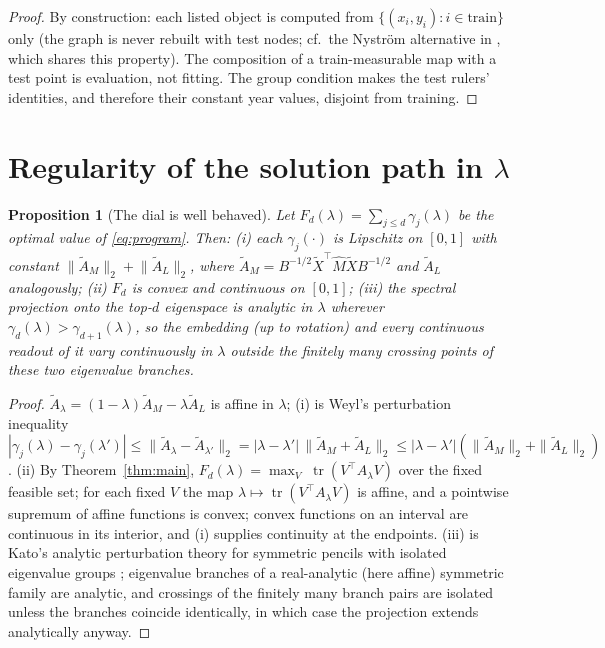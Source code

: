 \documentclass[11pt]{article}
\newtheorem{proposition}{Proposition}
\theoremstyle{remark}
\newcommand{\tr}{\operatorname{tr}}
\newcommand{\Xt}{\widetilde{X}}
\newcommand{\Mh}{\widehat{M}}
\begin{document}
\begin{proof}
By construction: each listed object is computed from $\{(x_i,y_i):i\in\text{train}\}$
only (the graph is never rebuilt with test nodes; cf.\ the Nystr\"om alternative in
\cite{bengio2004oos}, which shares this property). The composition of a train-measurable
map with a test point is evaluation, not fitting. The group condition makes the test
rulers' identities, and therefore their constant year values, disjoint from training.
\end{proof}

\section{Regularity of the solution path in $\lambda$}

\begin{proposition}[The dial is well behaved]\label{prop:path}
Let $F_d(\lambda)=\sum_{j\le d}\gamma_j(\lambda)$ be the optimal value of
\eqref{eq:program}. Then:
(i) each $\gamma_j(\cdot)$ is Lipschitz on $[0,1]$ with constant
$\big\|\tilde A_M\big\|_2+\big\|\tilde A_L\big\|_2$, where $\tilde A_M =
B^{-1/2}\Xt^{\!\top}\Mh\Xt B^{-1/2}$ and $\tilde A_L$ analogously;
(ii) $F_d$ is convex and continuous on $[0,1]$;
(iii) the spectral projection onto the top-$d$ eigenspace is analytic in $\lambda$
wherever $\gamma_d(\lambda)>\gamma_{d+1}(\lambda)$, so the embedding (up to rotation)
and every continuous readout of it vary continuously in $\lambda$ outside the finitely
many crossing points of these two eigenvalue branches.
\end{proposition}

\begin{proof}
$\tilde A_\lambda=(1-\lambda)\tilde A_M-\lambda\tilde A_L$ is affine in $\lambda$;
(i) is Weyl's perturbation inequality
$|\gamma_j(\lambda)-\gamma_j(\lambda')|\le\|\tilde A_\lambda-\tilde
A_{\lambda'}\|_2=|\lambda-\lambda'|\,\|\tilde A_M+\tilde A_L\|_2
\le|\lambda-\lambda'|(\|\tilde A_M\|_2+\|\tilde A_L\|_2)$.
(ii) By Theorem~\ref{thm:main},
$F_d(\lambda)=\max_{V}\;\tr(V^{\!\top}A_\lambda V)$ over the fixed feasible set; for
each fixed $V$ the map $\lambda\mapsto\tr(V^{\!\top}A_\lambda V)$ is affine, and a
pointwise supremum of affine functions is convex; convex functions on an interval are
continuous in its interior, and (i) supplies continuity at the endpoints.
(iii) is Kato's analytic perturbation theory for symmetric pencils with isolated
eigenvalue groups \cite{kato1966}; eigenvalue branches of a real-analytic (here affine)
symmetric family are analytic, and crossings of the finitely many branch pairs are
isolated unless the branches coincide identically, in which case the projection extends
analytically anyway.
\end{proof}
\end{document}
